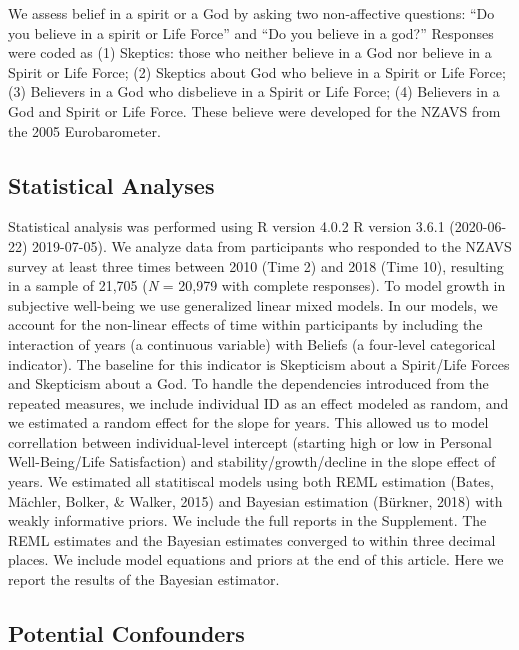 \documentclass[
  english,
  man,floatsintext]{apa6}
\begin{document}
We assess belief in a spirit or a God by asking two non-affective questions: \enquote{Do you believe in a spirit or Life Force} and \enquote{Do you believe in a god?} Responses were coded as (1) Skeptics: those who neither believe in a God nor believe in a Spirit or Life Force; (2) Skeptics about God who believe in a Spirit or Life Force; (3) Believers in a God who disbelieve in a Spirit or Life Force; (4) Believers in a God and Spirit or Life Force. These believe were developed for the NZAVS from the 2005 Eurobarometer.

\hypertarget{statistical-analyses}{%
\subsection{Statistical Analyses}\label{statistical-analyses}}

Statistical analysis was performed using R version 4.0.2 R version 3.6.1 (2020-06-22) 2019-07-05). We analyze data from participants who responded to the NZAVS survey at least three times between 2010 (Time 2) and 2018 (Time 10), resulting in a sample of 21,705 (\emph{N} = 20,979 with complete responses). To model growth in subjective well-being we use generalized linear mixed models. In our models, we account for the non-linear effects of time within participants by including the interaction of years (a continuous variable) with Beliefs (a four-level categorical indicator). The baseline for this indicator is Skepticism about a Spirit/Life Forces and Skepticism about a God. To handle the dependencies introduced from the repeated measures, we include individual ID as an effect modeled as random, and we estimated a random effect for the slope for years. This allowed us to model correllation between individual-level intercept (starting high or low in Personal Well-Being/Life Satisfaction) and stability/growth/decline in the slope effect of years. We estimated all statitiscal models using both REML estimation (Bates, Mächler, Bolker, \& Walker, 2015) and Bayesian estimation (Bürkner, 2018) with weakly informative priors. We include the full reports in the Supplement. The REML estimates and the Bayesian estimates converged to within three decimal places. We include model equations and priors at the end of this article. Here we report the results of the Bayesian estimator.

\hypertarget{potential-confounders}{%
\subsection{Potential Confounders}\label{potential-confounders}}
\end{document}
